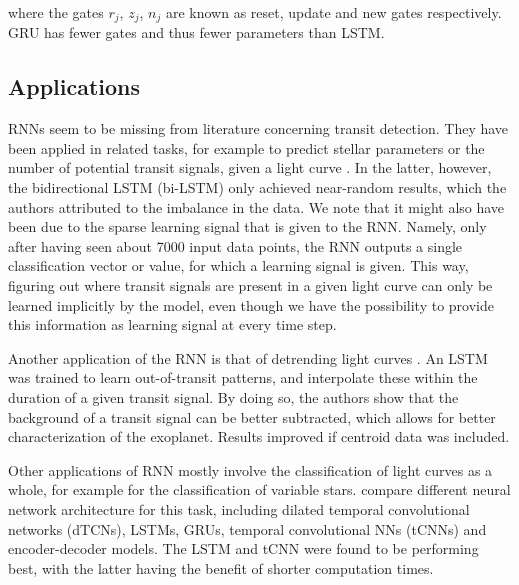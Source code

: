 \noindent where the gates $r_j$, $z_j$, $n_j$ are known as reset, update and new gates respectively. GRU has fewer gates and thus fewer parameters than LSTM.

\subsection{Applications}

RNNs seem to be missing from literature concerning transit detection. They have been applied in related tasks, for example to predict stellar parameters or the number of potential transit signals, given a light curve \citep{hinners2018machine}. In the latter, however, the bidirectional LSTM (bi-LSTM) only achieved near-random results, which the authors attributed to the imbalance in the data. We note that it might also have been due to the sparse learning signal that is given to the RNN. Namely, only after having seen about 7000 input data points, the RNN outputs a single classification vector or value, for which a learning signal is given. This way, figuring out where transit signals are present in a given light curve can only be learned implicitly by the model, even though we have the possibility to provide this information as learning signal at every time step.

Another application of the RNN is that of detrending light curves \citep{morvan2020detrending}. An LSTM was trained to learn out-of-transit patterns, and interpolate these within the duration of a given transit signal. By doing so, the authors show that the background of a transit signal can be better subtracted, which allows for better characterization of the exoplanet. Results improved if centroid data was included.

Other applications of RNN mostly involve the classification of light curves as a whole, for example for the classification of variable stars. \cite{jamal2020neural} compare different neural network architecture for this task, including dilated temporal convolutional networks (dTCNs), LSTMs, GRUs, temporal convolutional NNs (tCNNs) and encoder-decoder models. The LSTM and tCNN were found to be performing best, with the latter having the benefit of shorter computation times. 

